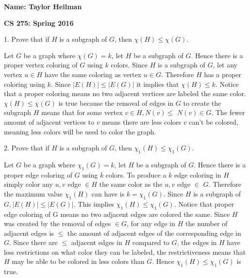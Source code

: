 \documentclass[12pt]{article}
\begin{document}
\textbf{Name: Taylor Heilman }    \hspace{4in} 
\begin{center} \textbf{CS 275: Spring 2016} \end{center}


{
1.  Prove that if $H$ is a subgraph of $G$, then $\chi(H) \leq \chi(G)$.

Let $G$ be a graph where $\chi(G) = k$, let $H$ be a subgraph of $G$.  Hence there is a proper vertex coloring of $G$ using $k$ colors.  Since $H$ is a subgraph of $G$, let any vertex $u \in H$ have the same coloring as vertex $u \in G$.  Therefore $H$ has a proper coloring using $k$.   Since $|E(H)|  \leq |E(G)|$ it implies that $\chi(H) \leq k$. Notice that a proper coloring means no two adjacent vertices are labeled the same color. $\chi(H) \leq \chi(G)$ is true because the removal of edges in $G$ to create the subgraph $H$ means that for some vertex $v \in H, N(v) \leq$  $N(v)  \in G$. The fewer amount of adjacent vertices to $v$ means there are less colors $v$ can't be colored, meaning less colors will be used to color the graph.

}

{
2. Prove that if $H$ is a subgraph of $G$, then $\chi_1(H) \leq \chi_1(G)$.

Let $G$ be a graph where $\chi_1(G) = k$, let $H$ be a subgraph of $G$.  Hence there is a proper edge coloring of $G$ using $k$ colors. To produce a $k$ edge coloring in $H$ simply color any $u,v$ edge $\in H$ the same color as the $u,v$ edge $\in$ $G$.  Therefore the maximum value $\chi_1(H)$ can have is $k = \chi_1(G)$. Since $H$ is a subgraph of $G, |E(H)|  \leq |E(G)|$. This implies $\chi_1(H) \leq \chi_1(G)$.  Notice that proper edge coloring of G means no two adjacent edges are colored the same. Since $H$ was created by the removal of edges $\in G$, for any edge in $H$ the number of adjacent edges is $\leq$ the amount of adjacent edges of the corresponding edge in $G$. Since there are $\leq$ adjacent edges in $H$ compared to $G$, the edges in $H$ have less restrictions on what color they can be labeled, the restrictiveness means that $H$ may be able to be colored in less colors than $G$.  Hence $\chi_1(H) \leq \chi_1(G)$ is true.

}
\end{document}
